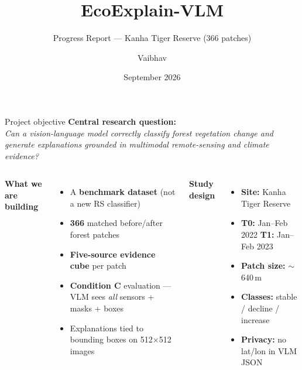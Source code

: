 \documentclass[aspectratio=169,10pt]{beamer}
\title{EcoExplain-VLM}
\subtitle{Progress Report --- Kanha Tiger Reserve (366 patches)}
\author{Vaibhav}
\date{September 2026}
\begin{document}
\begin{frame}{Project objective}
  \textbf{Central research question:}\\
  \emph{Can a vision-language model correctly classify forest vegetation change and
  generate explanations grounded in multimodal remote-sensing and climate evidence?}

  \vspace{0.5em}
  \begin{columns}[T,onlytextwidth]
    \textbf{What we are building}
    \begin{itemize}
      \item A \textbf{benchmark dataset} (not a new RS classifier)
      \item \textbf{366} matched before/after forest patches
      \item \textbf{Five-source evidence cube} per patch
      \item \textbf{Condition C} evaluation --- VLM sees \emph{all} sensors + masks + boxes
      \item Explanations tied to bounding boxes on 512$\times$512 images
    \end{itemize}

    \textbf{Study design}
    \begin{itemize}\footnotesize
      \item \textbf{Site:} Kanha Tiger Reserve
      \item \textbf{T0:} Jan--Feb 2022 \quad \textbf{T1:} Jan--Feb 2023
      \item \textbf{Patch size:} $\sim$640\,m
      \item \textbf{Classes:} stable / decline / increase
      \item \textbf{Privacy:} no lat/lon in VLM JSON
    \end{itemize}
  \end{columns}
\end{frame}
\end{document}
